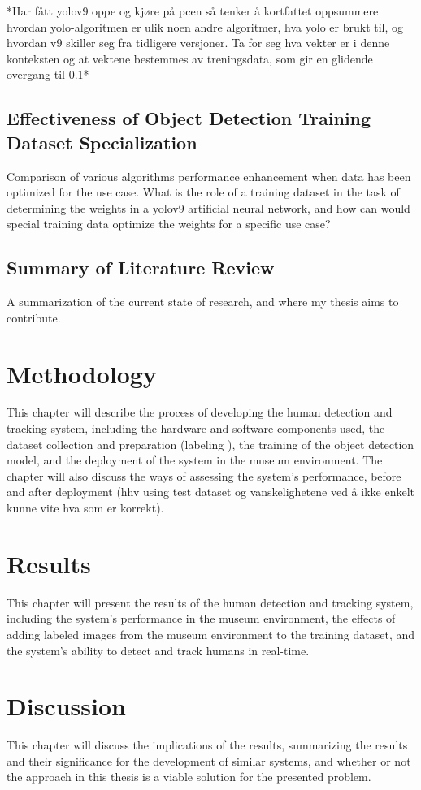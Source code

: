 *Har fått yolov9 oppe og kjøre på pcen så tenker å kortfattet oppsummere hvordan yolo-algoritmen er ulik noen andre algoritmer, hva yolo er brukt til, og hvordan v9 skiller seg fra tidligere versjoner. Ta for seg hva vekter er i denne konteksten og at vektene bestemmes av treningsdata, som gir en glidende overgang til \ref{sec:dataset_specialization}* 

\subsection{Effectiveness of Object Detection Training Dataset Specialization}
\label{sec:dataset_specialization}
Comparison of various algorithms performance enhancement when data has been optimized for the use case. What is the role of a training dataset in the task of determining the weights in a yolov9 artificial neural network, and how can would special training data optimize the weights for a specific use case?

\subsection{Summary of Literature Review}
A summarization of the current state of research, and where my thesis aims to contribute.

\section{Methodology}
This chapter will describe the process of developing the human detection and tracking system, including the hardware and software components used, the dataset collection and preparation (labeling ), the training of the object detection model, and the deployment of the system in the museum environment. The chapter will also discuss the ways of assessing the system's performance, before and after deployment (hhv using test dataset og vanskelighetene ved å ikke enkelt kunne vite hva som er korrekt).

\section{Results}
This chapter will present the results of the human detection and tracking system, including the system's performance in the museum environment, the effects of adding labeled images from the museum environment to the training dataset, and the system's ability to detect and track humans in real-time.

\section{Discussion}
This chapter will discuss the implications of the results, summarizing the results and their significance for the development of similar systems, and whether or not the approach in this thesis is a viable solution for the presented problem. 

